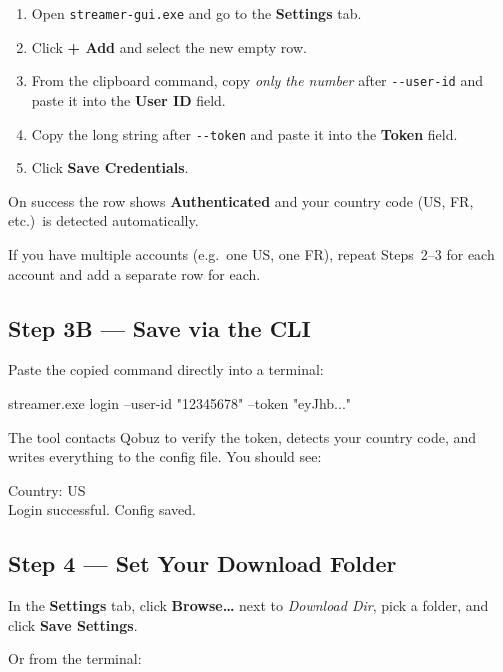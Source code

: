 \documentclass[11pt,a4paper]{article}
\begin{document}
\begin{enumerate}
  \item Open \texttt{streamer-gui.exe} and go to the \textbf{Settings} tab.
  \item Click \textbf{+ Add} and select the new empty row.
  \item From the clipboard command, copy \emph{only the number} after
        \texttt{-{}-user-id} and paste it into the \textbf{User ID} field.
  \item Copy the long string after \texttt{-{}-token} and paste it into the
        \textbf{Token} field.
  \item Click \textbf{Save Credentials}.
\end{enumerate}

On success the row shows \textbf{Authenticated} and your country code (US, FR,
etc.)\ is detected automatically.

\begin{tipbox}
If you have multiple accounts (e.g.\ one US, one FR), repeat Steps~2--3 for
each account and add a separate row for each.
\end{tipbox}

\subsection{Step 3B --- Save via the CLI}

Paste the copied command directly into a terminal:

\begin{cmdbox}
streamer.exe login --user-id "12345678" --token "eyJhb..."
\end{cmdbox}

The tool contacts Qobuz to verify the token, detects your country code, and
writes everything to the config file.  You should see:

\begin{cmdbox}
Country: US\\
Login successful. Config saved.
\end{cmdbox}

\subsection{Step 4 --- Set Your Download Folder}

In the \textbf{Settings} tab, click \textbf{Browse\ldots} next to
\emph{Download Dir}, pick a folder, and click \textbf{Save Settings}.

Or from the terminal:
\end{document}
